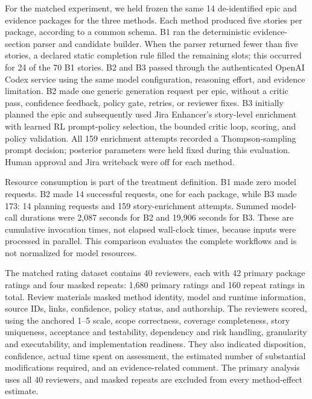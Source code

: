 \documentclass[pdflatex,sn-basic]{sn-jnl}
\begin{document}
For the matched experiment, we held frozen the same 14 de-identified epic and evidence packages for the three methods. Each method produced five stories per package, according to a common schema. B1 ran the deterministic evidence-section parser and candidate builder. When the parser returned fewer than five stories, a declared static completion rule filled the remaining slots; this occurred for 24 of the 70 B1 stories. B2 and B3 passed through the authenticated OpenAI Codex service using the same model configuration, reasoning effort, and evidence limitation. B2 made one generic generation request per epic, without a critic pass, confidence feedback, policy gate, retries, or reviewer fixes. B3 initially planned the epic and subsequently used Jira Enhancer's story-level enrichment with learned RL prompt-policy selection, the bounded critic loop, scoring, and policy validation. All 159 enrichment attempts recorded a Thompson-sampling prompt decision; posterior parameters were held fixed during this evaluation. Human approval and Jira writeback were off for each method.

Resource consumption is part of the treatment definition. B1 made zero model requests. B2 made 14 successful requests, one for each package, while B3 made 173: 14 planning requests and 159 story-enrichment attempts. Summed model-call durations were 2,087 seconds for B2 and 19,906 seconds for B3. These are cumulative invocation times, not elapsed wall-clock times, because inputs were processed in parallel. This comparison evaluates the complete workflows and is not normalized for model resources.

The matched rating dataset contains 40 reviewers, each with 42 primary package ratings and four masked repeats: 1,680 primary ratings and 160 repeat ratings in total. Review materials masked method identity, model and runtime information, source IDs, links, confidence, policy status, and authorship. The reviewers scored, using the anchored 1--5 scale, scope correctness, coverage completeness, story uniqueness, acceptance and testability, dependency and risk handling, granularity and executability, and implementation readiness. They also indicated disposition, confidence, actual time spent on assessment, the estimated number of substantial modifications required, and an evidence-related comment. The primary analysis uses all 40 reviewers, and masked repeats are excluded from every method-effect estimate.
\end{document}
